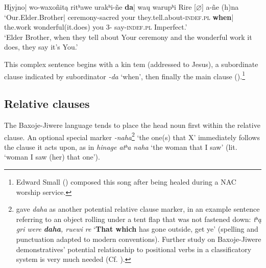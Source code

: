\documentclass[output=paper]{LSP/langsci}
\begin{document}
\ea \gll  H\k{i}y\k{i}no| wo-waxoñit\k{a}   ritʰawe  urakʰi-ñe   \textbf{da}| wa\k{u}       warupʰi  Rire  [$\varnothing$] a-ñe  (h)na \\ 
`Our.Elder.Brother| 	ceremony-sacred  your  they.tell.about-\textsc{indef.pl}   \textbf{when}| the.work wonderful(it.does)	  you  3- say-\textsc{indef.pl}         Imperfect.' \\
\trans `Elder Brother, when they tell about Your ceremony and the wonderful work it does, they say it's You.'
\z		

This complex sentence begins with a kin tem (addressed to Jesus), a subordinate clause indicated by subordinator \textit{-da} `when', then finally the main clause (\citealt[Song \#16]{Davidson1997}).\footnote{Edward Small () composed this song after being healed during a NAC worship service.}  		

\subsection{Relative clauses}  
The Baxoje-Jiwere language tends to place the head noun first within the relative clause.  An optional special marker \textit{-naha}\footnote{\citet{DorseyNDChiwere} gave \textit{daha} as another potential relative clause marker, in an example sentence referring to an object rolling under a tent flap that was not fastened down: \textit{tʰ\k{a} gri were \textbf{daha}, ruewi re} `\textbf{That which} has gone outside, get ye' (spelling and punctuation adapted to modern conventions). Further study on Baxoje-Jiwere demonstratives' potential relationship to positional verbs in a classificatory system is very much needed (Cf. \citealt[3]{Rankin2005b}).}  `the one(s) that X' immediately follows the clause it acts upon, as in \textit{hinage atʰa naha} `the woman that I saw' (lit. `woman I saw (her) that one').   
\end{document}
